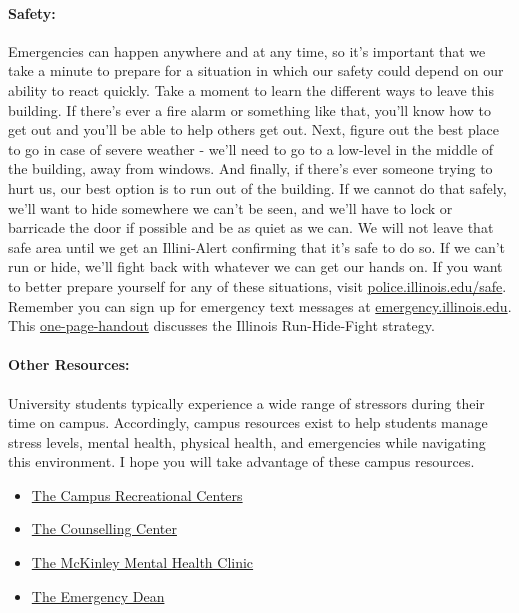 \documentclass[11pt, a4paper]{article}
\begin{document}
\paragraph{Safety:}
Emergencies can happen anywhere and at any time, so it’s important that we take
a minute to prepare for a situation in which our safety could depend on our
ability to react quickly. Take a moment to learn the different ways to leave
this building. If there's ever a fire alarm or something like that, you’ll know
how to get out and you'll be able to help others get out. Next, figure out the
best place to go in case of severe weather - we'll need to go to a low-level in
the middle of the building, away from windows. And finally, if there's ever
someone trying to hurt us, our best option is to run out of the building. If we
cannot do that safely, we'll want to hide somewhere we can't be seen, and we'll
have to lock or barricade the door if possible and be as quiet as we can. We
will not leave that safe area until we get an Illini-Alert confirming that it's
safe to do so. If we can't run or hide, we'll fight back with whatever we can
get our hands on. If you want to better prepare yourself for any of these
situations, visit \url{police.illinois.edu/safe}. Remember you can sign up for
emergency text messages at \url{emergency.illinois.edu}. This
\href{http://police.illinois.edu/dpsapp/wp-content/uploads/2017/08/syllabus-attachment.pdf}{one-page-handout}
discusses the Illinois Run-Hide-Fight strategy.


\paragraph{Other Resources:}
University students typically experience a wide range of stressors during their
time on campus. Accordingly, campus resources exist to help students manage
stress levels, mental health, physical health, and emergencies while navigating
this environment. I hope you will take advantage of these campus resources.

\begin{itemize}
\item \href{https://campusrec.illinois.edu/}{The Campus Recreational Centers}
\item \href{http://counselingcenter.illinois.edu/}{The Counselling Center}
\item \href{http://www.mckinley.illinois.edu/clinics/mental\_health.htm}{The McKinley Mental Health Clinic}
\item \href{http://odos.illinois.edu/emergency/}{The Emergency Dean}
\end{itemize}
\end{document}
